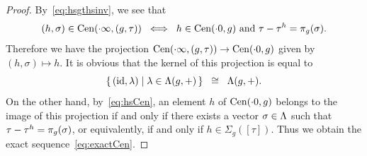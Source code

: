 \documentclass{amsart} %
\begin{document}
%
\begin{proof}
By~\eqref{eq:hsgthsinv}, we see that 
%
\begin{equation}\label{eq:hsCen}
(h, \sigma)\in  \mathrm{Cen}(\cdot \infty, (g, \tau))
\;\; \Longleftrightarrow\;\; 
\textrm{$h\in \mathrm{Cen}(\cdot 0, g)$ and $\tau-\tau^h=\pi_{g}(\sigma)$}.
\end{equation}
%
Therefore we have  the projection 
$\mathrm{Cen}(\cdot \infty, (g, \tau))\to \mathrm{Cen}(\cdot 0, g)$
given by $(h, \sigma)\mapsto h$.
It is obvious that the kernel of this projection  is equal to 
\[
\{\,{(\mathord{\mathrm{id}}, \lambda)}\mid {\lambda\in  \Lambda(g, +)} \,\}\;\;\cong\;\; \Lambda(g, +).
\]
On the other hand, by~\eqref{eq:hsCen}, 
an element  $h$ of $\mathrm{Cen}(\cdot 0, g)$
belongs to the image of this projection  if and only if 
there exists a vector $\sigma\in \Lambda$ such that 
$\tau-\tau^h=\pi_{g}(\sigma)$, or equivalently, if and only if 
$h\in \Sigma_g([\tau]) $.
Thus we obtain the exact sequence~\eqref{eq:exactCen}.
\end{proof}
%
%
\end{document}

